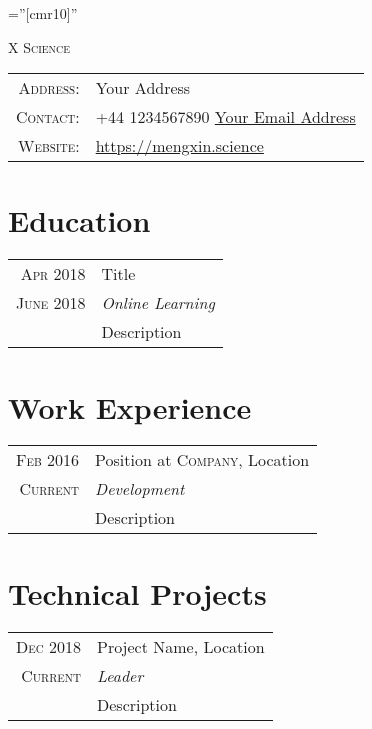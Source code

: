 \documentclass[a4paper,10pt]{article}
\begin{document}
\pagestyle{empty}

\font\fb=''[cmr10]'' %

\par{\centering
        {\Huge X \textsc{Science}
    }\bigskip\par}


\begin{tabular}{rl}
    \textsc{Address:} & Your Address \\
    \textsc{Contact:} &  +44 1234567890 \qquad   \href{mailto:email}{Your Email Address}\\
    \textsc{Website:} & \url{https://mengxin.science}\\
\end{tabular}

\section{Education}
\begin{longtable}{r|p{14.5cm}}
\textsc{Apr} 2018  & Title\\
\textsc{June} 2018 & \emph{Online Learning}\\
&\footnotesize{Description} 
 \\
\end{longtable}

\section{Work Experience}
\begin{longtable}{r|p{14.5cm}}

\textsc{Feb 2016} & Position at \textsc{Company}, Location\\
\textsc{Current} &\emph{Development}\\
&\footnotesize{Description}
\\

\end{longtable}

\section{Technical Projects}
\begin{longtable}{r|p{14.5cm}}

\textsc{Dec 2018} & Project Name, Location \\
\textsc{Current} &\emph{Leader} \\
&\footnotesize{Description}
\\
\end{longtable}
\end{document}
